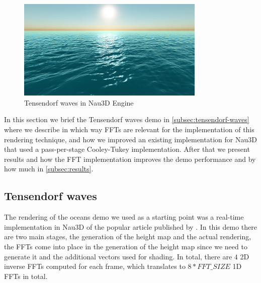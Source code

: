 \documentclass[
  oneside,
  11pt, a4paper,
  footinclude=true,
  headinclude=true,
  cleardoublepage=empty
]{scrbook}
\begin{document}
\begin{figure}[H] 
    \centering
    \includegraphics[width=0.8\textwidth]{img/ocean.png}
    \caption{Tensendorf waves in Nau3D Engine}
    \label{fig:tensendorf-waves-nau}
\end{figure}

In this section we brief the Tensendorf waves demo in \autoref{subsec:tensendorf-waves} where we describe in which way FFTs are relevant for the implementation of this rendering technique, and how we improved an existing implementation for Nau3D that used a pass-per-stage Cooley-Tukey implementation. After that we present results and how the FFT implementation improves the demo performance and by how much in \autoref{subsec:results}.

\subsection{Tensendorf waves} \label{subsec:tensendorf-waves}

The rendering of the oceans demo we used as a starting point was a real-time implementation in Nau3D of the popular article published by \cite{tessendorf2001simulating}. In this demo there are two main stages, the generation of the height map and the actual rendering, the FFTs come into place in the generation of the height map since we need to generate it and the additional vectors used for shading. In total, there are $4$ 2D inverse FFTs computed for each frame, which translates to $8*FFT\_SIZE$ 1D FFTs in total.


\end{document}
